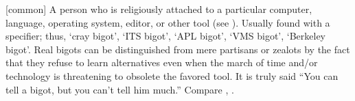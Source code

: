 [common] A person who is religiously attached to a particular computer,
language, operating system, editor, or other tool (see ). Usually found with a specifier; thus, `cray bigot', `ITS bigot', `APL
bigot', `VMS bigot', `Berkeley bigot'. Real bigots can be distinguished from
mere partisans or zealots by the fact that they refuse to learn alternatives
even when the march of time and/or technology is threatening to obsolete the
favored tool. It is truly said ``You can tell a bigot, but you can't tell him
much.'' Compare , .

